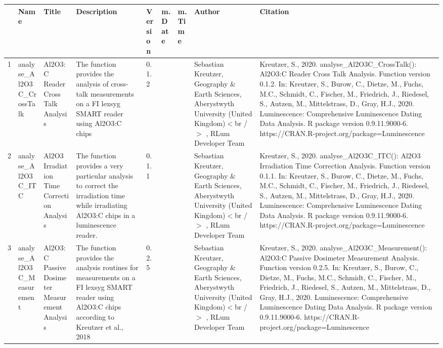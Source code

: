 \begin{table}[ht]
\centering
\begin{tabular}{rllllllll}
  \hline
 & Name & Title & Description & Version & m.Date & m.Time & Author & Citation \\ 
  \hline
1 & analyse\_Al2O3C\_CrossTalk & Al2O3:C Reader Cross Talk Analysis & The function provides the analysis of cross-talk measurements on a FI lexsyg SMART reader using Al2O3:C chips & 0.1.2
 &  &  & Sebastian Kreutzer, Geography \& Earth Sciences, Aberystwyth University (United Kingdom)$<$br /$>$ , RLum Developer Team & Kreutzer, S., 2020. analyse\_Al2O3C\_CrossTalk(): Al2O3:C Reader Cross Talk Analysis. Function version 0.1.2. In: Kreutzer, S., Burow, C., Dietze, M., Fuchs, M.C., Schmidt, C., Fischer, M., Friedrich, J., Riedesel, S., Autzen, M., Mittelstrass, D., Gray, H.J., 2020. Luminescence: Comprehensive Luminescence Dating Data Analysis. R package version 0.9.11.9000-6. https://CRAN.R-project.org/package=Luminescence
 \\ 
  2 & analyse\_Al2O3C\_ITC & Al2O3 Irradiation Time Correction Analysis & The function provides a very particular analysis to correct the irradiation time while irradiating Al2O3:C chips in a luminescence reader. & 0.1.1
 &  &  & Sebastian Kreutzer, Geography \& Earth Sciences, Aberystwyth University (United Kingdom)$<$br /$>$ , RLum Developer Team & Kreutzer, S., 2020. analyse\_Al2O3C\_ITC(): Al2O3 Irradiation Time Correction Analysis. Function version 0.1.1. In: Kreutzer, S., Burow, C., Dietze, M., Fuchs, M.C., Schmidt, C., Fischer, M., Friedrich, J., Riedesel, S., Autzen, M., Mittelstrass, D., Gray, H.J., 2020. Luminescence: Comprehensive Luminescence Dating Data Analysis. R package version 0.9.11.9000-6. https://CRAN.R-project.org/package=Luminescence
 \\ 
  3 & analyse\_Al2O3C\_Measurement & Al2O3:C Passive Dosimeter Measurement Analysis & The function provides the analysis routines for measurements on a FI lexsyg SMART reader using Al2O3:C chips according to Kreutzer et al., 2018 & 0.2.5
 &  &  & Sebastian Kreutzer, Geography \& Earth Sciences, Aberystwyth University (United Kingdom)$<$br /$>$ , RLum Developer Team & Kreutzer, S., 2020. analyse\_Al2O3C\_Measurement(): Al2O3:C Passive Dosimeter Measurement Analysis. Function version 0.2.5. In: Kreutzer, S., Burow, C., Dietze, M., Fuchs, M.C., Schmidt, C., Fischer, M., Friedrich, J., Riedesel, S., Autzen, M., Mittelstrass, D., Gray, H.J., 2020. Luminescence: Comprehensive Luminescence Dating Data Analysis. R package version 0.9.11.9000-6. https://CRAN.R-project.org/package=Luminescence

\end{tabular}
\end{table}
